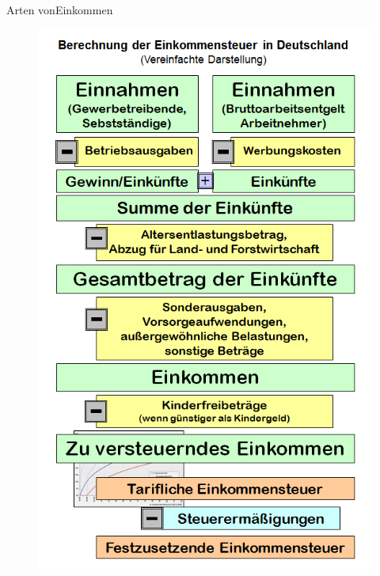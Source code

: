 \documentclass{beamer}
\begin{document}
			\begin{frame}{Arten von\newline Einkommen}
				\begin{center}
					\begin{figure}
						\vspace{-1.5cm}
						\includegraphics[height=0.9\textheight]{images/zu-versteuerndes-einkommen}
					\end{figure}
				\end{center}
			\end{frame}
			
\end{document}

